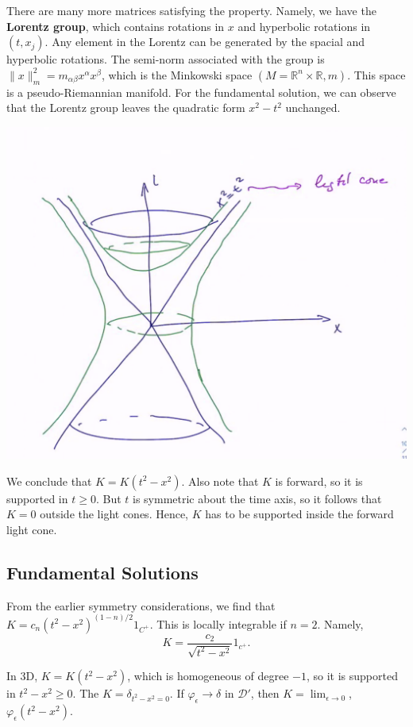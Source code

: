 \documentclass[12pt]{scrartcl}
\newcommand{\R}{\mathbb{R}}
\let \phi \varphi
\begin{document}
There are many more matrices satisfying the property.  Namely, we have the \textbf{Lorentz group}, which contains rotations in $x$ and hyperbolic rotations in $(t, x_j)$.  Any element in the Lorentz can be generated by the spacial and hyperbolic rotations.  The semi-norm associated with the group is $\|x\|_m^2 = m_{\alpha \beta} x^\alpha x^\beta$, which is the Minkowski space $(M = \R^n \times \R, m)$.  This space is a pseudo-Riemannian manifold.  For the fundamental solution, we can observe that the Lorentz group leaves the quadratic form $x^2 - t^2$ unchanged.  
\begin{center}
\includegraphics[scale=0.5]{minkSpace.png}
\end{center}
We conclude that $K = K(t^2 - x^2)$.  Also note that $K$ is forward, so it is supported in $t \ge 0$.  But $t$ is symmetric about the time axis, so it follows that $K = 0$ outside the light cones.  Hence, $K$ has to be supported inside the forward light cone.  
\subsection{Fundamental Solutions}
From the earlier symmetry considerations, we find that $K = c_n (t^2 - x^2)^{(1-n)/2} 1_{C^+}$.  This is locally integrable if $n = 2$.  
Namely,
$$K = \frac{c_2}{\sqrt{t^2 - x^2}}1_{c^+}.$$

In 3D, $K = K(t^2 - x^2)$, which is homogeneous of degree $-1$, so it is supported in $t^2 - x^2 \ge 0$.
The $K = \delta_{t^2 - x^2 = 0}$.  If $\phi_\epsilon \to \delta$ in $\mathcal D'$, then $K = \lim_{\epsilon \to 0}$, $\phi_\epsilon(t^2 - x^2)$.
\end{document}
